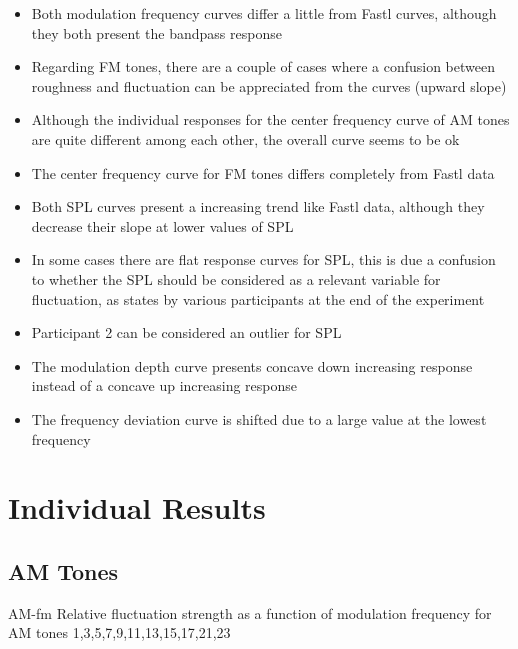 \documentclass{article}
\begin{document}
\begin{itemize}
  \item Both modulation frequency curves differ a little from Fastl curves,
  although they both present the bandpass response
  \item Regarding FM tones, there are a couple of cases where a confusion
  between roughness and fluctuation can be appreciated from the curves (upward
  slope)
  \item Although the individual responses for the center frequency curve of AM
  tones are quite different among each other, the overall curve seems to be ok
  \item The center frequency curve for FM tones differs completely from Fastl
  data
  \item Both SPL curves present a increasing trend like Fastl data, although
  they decrease their slope at lower values of SPL
  \item In some cases there are flat response curves for SPL, this is due a
  confusion to whether the SPL should be considered as a relevant variable for
  fluctuation, as states by various participants at the end of the experiment
  \item Participant 2 can be considered an outlier for SPL
  \item The modulation depth curve presents concave down increasing response
  instead of a concave up increasing response
  \item The frequency deviation curve is shifted due to a large value at the
  lowest frequency
\end{itemize}


\clearpage

\appendix

\section{Individual Results} %
\label{sec:individual_results}

\subsection{AM Tones} %
\label{subsec:individual_results_am_tones}

  {AM-fm}
  {Relative fluctuation strength as a function of modulation frequency for AM
  tones}
  {1,3,5,7,9,11,13,15,17,21,23}

\clearpage
\end{document}
